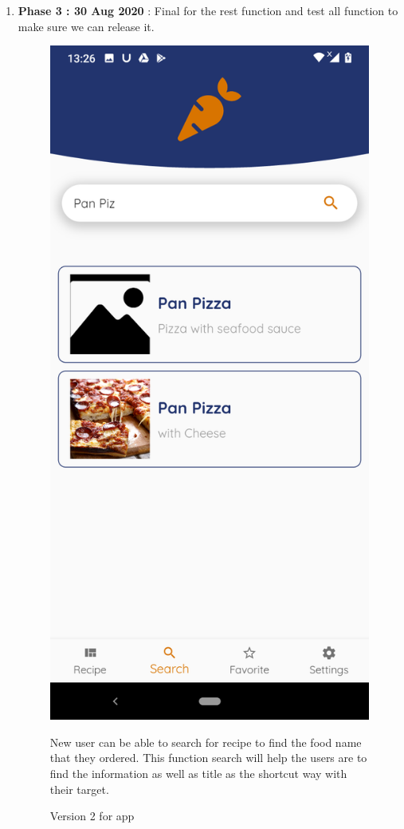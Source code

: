 \documentclass{article}
\begin{document}
\begin{enumerate}
        \item \textbf{Phase 3 : 30 Aug 2020} : Final for the rest function and test all function to make sure we can release it. \\
        \begin{figure}[h!]
        \centering
        \includegraphics[scale=0.1]{Images/Search.jpg}
        \caption{Version 2 for app}
        \label{fig:cookingbook}
        New user can be able to search for recipe to find the food name that they ordered. This function search will help the users are to find the information as well as title as the shortcut way with their target.
        \end{figure}

    \end{enumerate}
\end{document}
